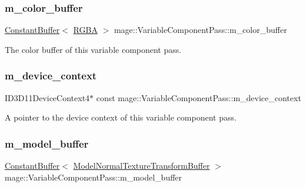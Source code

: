 \subsubsection{\texorpdfstring{m\+\_\+color\+\_\+buffer}{m\_color\_buffer}}
{\footnotesize\ttfamily \hyperlink{classmage_1_1_constant_buffer}{Constant\+Buffer}$<$ \hyperlink{structmage_1_1_r_g_b_a}{R\+G\+BA} $>$ mage\+::\+Variable\+Component\+Pass\+::m\+\_\+color\+\_\+buffer\hspace{0.3cm}{\ttfamily [private]}}

The color buffer of this variable component pass. \hypertarget{classmage_1_1_variable_component_pass_ae4929d1a04aba3457e04e5e50754c138}{}\label{classmage_1_1_variable_component_pass_ae4929d1a04aba3457e04e5e50754c138} 
\subsubsection{\texorpdfstring{m\+\_\+device\+\_\+context}{m\_device\_context}}
{\footnotesize\ttfamily I\+D3\+D11\+Device\+Context4$\ast$ const mage\+::\+Variable\+Component\+Pass\+::m\+\_\+device\+\_\+context\hspace{0.3cm}{\ttfamily [private]}}

A pointer to the device context of this variable component pass. \hypertarget{classmage_1_1_variable_component_pass_a2ddb72a3c1464e7ab0f788df25ae733a}{}\label{classmage_1_1_variable_component_pass_a2ddb72a3c1464e7ab0f788df25ae733a} 
\subsubsection{\texorpdfstring{m\+\_\+model\+\_\+buffer}{m\_model\_buffer}}
{\footnotesize\ttfamily \hyperlink{classmage_1_1_constant_buffer}{Constant\+Buffer}$<$ \hyperlink{structmage_1_1_model_normal_texture_transform_buffer}{Model\+Normal\+Texture\+Transform\+Buffer} $>$ mage\+::\+Variable\+Component\+Pass\+::m\+\_\+model\+\_\+buffer\hspace{0.3cm}{\ttfamily [private]}}

